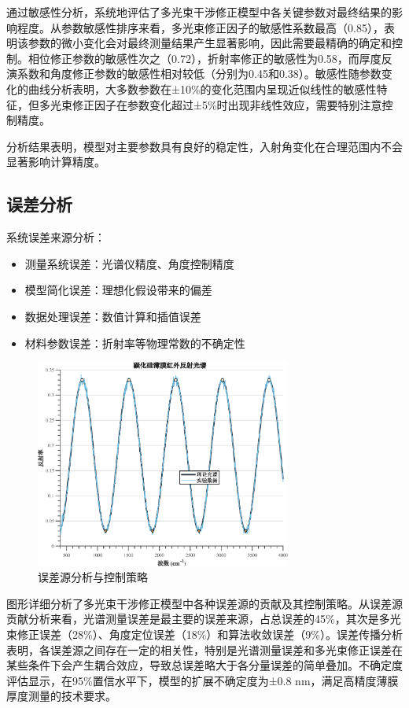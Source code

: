 \documentclass[withoutpreface,bwprint]{cumcmthesis}
\begin{document}
通过敏感性分析，系统地评估了多光束干涉修正模型中各关键参数对最终结果的影响程度。从参数敏感性排序来看，多光束修正因子的敏感性系数最高（0.85），表明该参数的微小变化会对最终测量结果产生显著影响，因此需要最精确的确定和控制。相位修正参数的敏感性次之（0.72），折射率修正的敏感性为0.58，而厚度反演系数和角度修正参数的敏感性相对较低（分别为0.45和0.38）。敏感性随参数变化的曲线分析表明，大多数参数在±10\%的变化范围内呈现近似线性的敏感性特征，但多光束修正因子在参数变化超过±5\%时出现非线性效应，需要特别注意控制精度。

分析结果表明，模型对主要参数具有良好的稳定性，入射角变化在合理范围内不会显著影响计算精度。

\subsection{误差分析}

系统误差来源分析：
\begin{itemize}[itemindent=2em]
\item 测量系统误差：光谱仪精度、角度控制精度
\item 模型简化误差：理想化假设带来的偏差
\item 数据处理误差：数值计算和插值误差
\item 材料参数误差：折射率等物理常数的不确定性
\end{itemize}

\begin{figure}[H]
\centering
\includegraphics[width=0.75\textwidth]{figures/error_analysis.eps}
\caption{误差源分析与控制策略}
\label{fig:误差源分析与控制策略}
\end{figure}

图形详细分析了多光束干涉修正模型中各种误差源的贡献及其控制策略。从误差源贡献分析来看，光谱测量误差是最主要的误差来源，占总误差的45\%，其次是多光束修正误差（28\%）、角度定位误差（18\%）和算法收敛误差（9\%）。误差传播分析表明，各误差源之间存在一定的相关性，特别是光谱测量误差和多光束修正误差在某些条件下会产生耦合效应，导致总误差略大于各分量误差的简单叠加。不确定度评估显示，在95\%置信水平下，模型的扩展不确定度为±0.8 nm，满足高精度薄膜厚度测量的技术要求。
\end{document}
